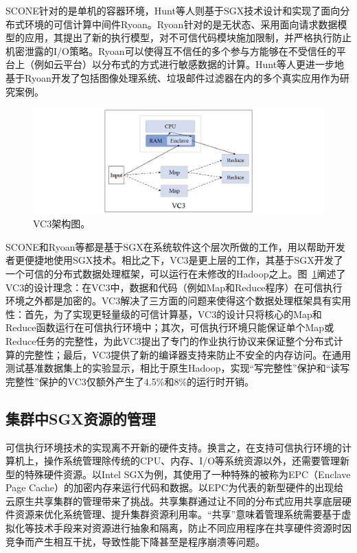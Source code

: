 SCONE针对的是单机的容器环境，Hunt等人则基于SGX技术设计和实现了面向分布式环境的可信计算中间件Ryoan。Ryoan针对的是无状态、采用面向请求数据模型的应用，其提出了新的执行模型，对不可信代码模块施加限制，并严格执行防止机密泄露的I/O策略。Ryoan可以使得互不信任的多个参与方能够在不受信任的平台上（例如云平台）以分布式的方式进行敏感数据的计算。Hunt等人更进一步地基于Ryoan开发了包括图像处理系统、垃圾邮件过滤器在内的多个真实应用作为研究案例。

\begin{figure}[h]
    \centerline{\includegraphics[width=\textwidth]{figures/vc3-arch.png}}
    \caption{VC3架构图。}
    \label{vc3_arch}
\end{figure}

SCONE和Ryoan等都是基于SGX在系统软件这个层次所做的工作，用以帮助开发者更便捷地使用SGX技术。相比之下，VC3是更上层的工作，其基于SGX开发了一个可信的分布式数据处理框架，可以运行在未修改的Hadoop之上。图~\ref{vc3_arch}阐述了VC3的设计理念：在VC3中，数据和代码（例如Map和Reduce程序）在可信执行环境之外都是加密的。VC3解决了三方面的问题来使得这个数据处理框架具有实用性：首先，为了实现更轻量级的可信计算基，VC3的设计只将核心的Map和Reduce函数运行在可信执行环境中；其次，可信执行环境只能保证单个Map或Reduce任务的完整性，为此VC3提出了专门的作业执行协议来保证整个分布式计算的完整性；最后，VC3提供了新的编译器支持来防止不安全的内存访问。在通用测试基准数据集上的实验显示，相比于原生Hadoop，实现“写完整性”保护和“读写完整性”保护的VC3仅额外产生了4.5\%和8\%的运行时开销。

\subsection{集群中SGX资源的管理}

可信执行环境技术的实现离不开新的硬件支持。换言之，在支持可信执行环境的计算机上，操作系统管理除传统的CPU、内存、I/O等系统资源以外，还需要管理新型的特殊硬件资源。以Intel SGX为例，其使用了一种特殊的被称为EPC（Enclave Page Cache）的加密内存来运行代码和数据。以EPC为代表的新型硬件的出现给云原生共享集群的管理带来了挑战。共享集群通过让不同的分布式应用共享底层硬件资源来优化系统管理、提升集群资源利用率。“共享”意味着管理系统需要基于虚拟化等技术手段来对资源进行抽象和隔离，防止不同应用程序在共享硬件资源时因竞争而产生相互干扰，导致性能下降甚至是程序崩溃等问题。

